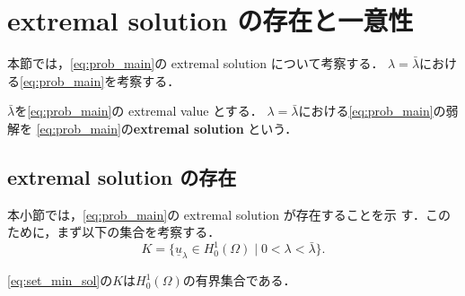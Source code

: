\section{extremal solution の存在と一意性} \label{sec:extremal_sol}

本節では，\ref{eq:prob_main}の extremal solution について考察する．
$\lambda = \bar{\lambda}$における\ref{eq:prob_main}を考察する．

\begin{defn}
 $\bar{\lambda}$を\ref{eq:prob_main}の extremal value とする．
 $\lambda = \bar{\lambda}$における\ref{eq:prob_main}の弱解を
 \ref{eq:prob_main}の{\bf extremal solution }という．
\end{defn}

\subsection{extremal solution の存在}

本小節では，\ref{eq:prob_main}の extremal solution が存在することを示
す．このために，まず以下の集合を考察する．
\begin{equation}
 K = \{ \underline{u}_\lambda \in H_0^1(\Omega) \mid 0 < \lambda <
  \bar{\lambda} \}.
  \label{eq:set_min_sol}
\end{equation}

\begin{lem} \label{lem:set_min_sol}
 \eqref{eq:set_min_sol}の$K$は$H_0^1(\Omega)$の有界集合である．
\end{lem}

